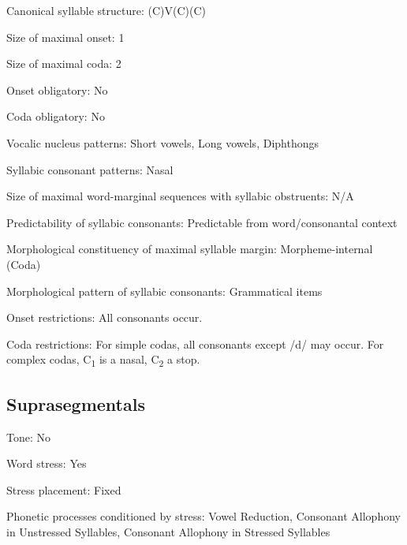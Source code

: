 {\begin{appendixdesc}
\item[Canonical syllable structure:] (C)V(C)(C) \citep[6--9]{Sapir1965}

\item[Size of maximal onset:] 1

\item[Size of maximal coda:] 2

\item[Onset obligatory:] No

\item[Coda obligatory:] No

\item[Vocalic nucleus patterns:] Short vowels, Long vowels, Diphthongs

\item[Syllabic consonant patterns:] Nasal

\item[Size of maximal word-marginal sequences with syllabic obstruents:] N/A

\item[Predictability of syllabic consonants:] Predictable from word/consonantal context

\item[Morphological constituency of maximal syllable margin:] Morpheme-internal (Coda)

\item[Morphological pattern of syllabic consonants:] Grammatical items

\item[Onset restrictions:] All consonants occur.

\item[Coda restrictions:] For simple codas, all consonants except /d/ may occur. For complex codas, C\textsubscript{1} is a nasal, C\textsubscript{2} a stop.
\end{appendixdesc}
\subsection*{Suprasegmentals}
\begin{appendixdesc}
\item[Tone:] No

\item[Word stress:] Yes

\item[Stress placement:] Fixed

\item[Phonetic processes conditioned by stress:] Vowel Reduction, Consonant Allophony in Unstressed Syllables, Consonant Allophony in Stressed Syllables


\end{appendixdesc}}
